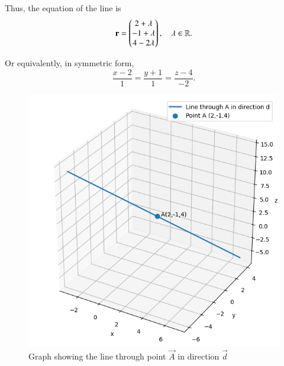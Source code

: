 \documentclass[journal]{IEEEtran}
\begin{document}
Thus, the equation of the line is
\[
\mathbf{r} = \begin{pmatrix}2 + \lambda \\ -1 + \lambda \\ 4 - 2\lambda\end{pmatrix}, \quad \lambda \in \mathbb{R}.
\]

\vspace{0.3cm}

Or equivalently, in symmetric form,
\[
\frac{x-2}{1} = \frac{y+1}{1} = \frac{z-4}{-2}.
\]

\begin{figure}[htbp]
    \centering
    \includegraphics[width=0.8\linewidth]{figs/fig1.jpg}
    \caption{Graph showing the line through point $\vec{A}$ in direction $\vec{d}$}
    \label{fig:fig1}
\end{figure}
\end{document}
